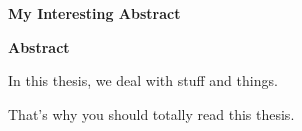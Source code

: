
\thispagestyle{plain}
\begin{center}
    \Large
    \textbf{My Interesting Abstract}%
       
    \vspace{0.9cm}
    \textbf{Abstract}
\end{center}

In this thesis, we deal with stuff and things.

That's why you should totally read this thesis.
